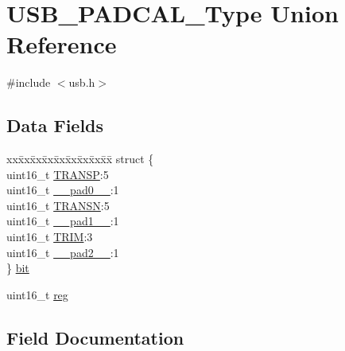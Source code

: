 \hypertarget{union_u_s_b___p_a_d_c_a_l___type}{}\section{U\+S\+B\+\_\+\+P\+A\+D\+C\+A\+L\+\_\+\+Type Union Reference}
\label{union_u_s_b___p_a_d_c_a_l___type}


{\ttfamily \#include $<$usb.\+h$>$}

\subsection*{Data Fields}
\begin{DoxyCompactItemize}
\item 
\begin{tabbing}
xx\=xx\=xx\=xx\=xx\=xx\=xx\=xx\=xx\=\kill
struct \{\\
\>uint16\_t \mbox{\hyperlink{union_u_s_b___p_a_d_c_a_l___type_a287952231554cff5ea1c3734346568d1}{TRANSP}}:5\\
\>uint16\_t \mbox{\hyperlink{union_u_s_b___p_a_d_c_a_l___type_a77132c2c26a75f5b8751b235cda23828}{\_\_pad0\_\_}}:1\\
\>uint16\_t \mbox{\hyperlink{union_u_s_b___p_a_d_c_a_l___type_ad282de1ba9436aa621bb90d14ff88eb6}{TRANSN}}:5\\
\>uint16\_t \mbox{\hyperlink{union_u_s_b___p_a_d_c_a_l___type_ab72e3a1f2f7db8695c60c658f5a0f11a}{\_\_pad1\_\_}}:1\\
\>uint16\_t \mbox{\hyperlink{union_u_s_b___p_a_d_c_a_l___type_a990531a7c9bfbd0280175451d35ad875}{TRIM}}:3\\
\>uint16\_t \mbox{\hyperlink{union_u_s_b___p_a_d_c_a_l___type_a82701c5ec65a0fca9a84d8edc46a8192}{\_\_pad2\_\_}}:1\\
\} \mbox{\hyperlink{union_u_s_b___p_a_d_c_a_l___type_a504caaebaf1f0ab54e9fe25bf3c3fc1c}{bit}}\\

\end{tabbing}\item 
uint16\+\_\+t \mbox{\hyperlink{union_u_s_b___p_a_d_c_a_l___type_a11760f5020019f4aa8cb02e694f7cc44}{reg}}
\end{DoxyCompactItemize}


\subsection{Field Documentation}
\mbox{\label{union_u_s_b___p_a_d_c_a_l___type_a77132c2c26a75f5b8751b235cda23828}} 
